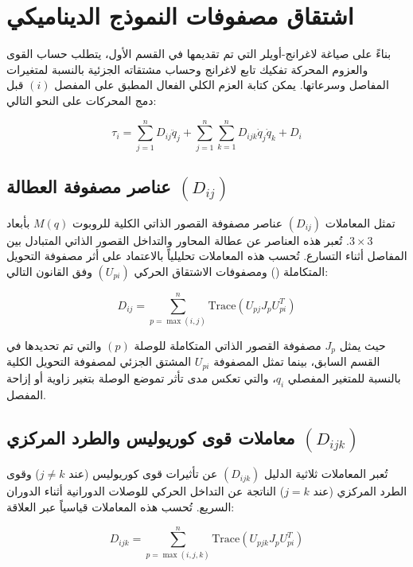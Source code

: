 \section{اشتقاق مصفوفات النموذج الديناميكي }
\label{sec:lagrange_derivation}

بناءً على صياغة لاغرانج-أويلر التي تم تقديمها في القسم الأول، يتطلب حساب القوى والعزوم المحركة تفكيك تابع لاغرانج وحساب مشتقاته الجزئية بالنسبة لمتغيرات المفاصل وسرعاتها.  يمكن كتابة العزم الكلي الفعال المطبق على المفصل $(i)$ قبل دمج المحركات على النحو التالي:

\begin{equation}
\tau_i = \sum_{j=1}^{n} D_{ij}\ddot{q}_j + \sum_{j=1}^{n} \sum_{k=1}^{n} D_{ijk}\dot{q}_j\dot{q}_k + D_i
\label{eq:full_analytical_lagrange}
\end{equation}


\subsection{عناصر مصفوفة العطالة $(D_{ij})$}
تمثل المعاملات $(D_{ij})$ عناصر مصفوفة القصور الذاتي الكلية للروبوت $M(q)$ بأبعاد $3 \times 3$. تُعبر هذه العناصر عن عطالة المحاور والتداخل القصور الذاتي المتبادل بين المفاصل أثناء التسارع. تُحسب هذه المعاملات تحليلياً بالاعتماد على أثر مصفوفة التحويل المتكاملة () ومصفوفات الاشتقاق الحركي $(U_{pi})$ وفق القانون التالي:

\begin{equation}
D_{ij} = \sum_{p=\max(i,j)}^{n} \text{Trace} \left( U_{pj} J_p U_{pi}^T \right)
\label{eq:inertia_element_law}
\end{equation}

حيث يمثل $J_p$ مصفوفة القصور الذاتي المتكاملة للوصلة $(p)$ والتي تم تحديدها في القسم السابق، بينما تمثل المصفوفة $U_{pi}$ المشتق الجزئي لمصفوفة التحويل الكلية بالنسبة للمتغير المفصلي $q_i$، والتي تعكس مدى تأثر تموضع الوصلة بتغير زاوية أو إزاحة المفصل.

\subsection{معاملات قوى كوريوليس والطرد المركزي $(D_{ijk})$}
تُعبر المعاملات ثلاثية الدليل $(D_{ijk})$ عن تأثيرات قوى كوريوليس (عند $j \neq k$) وقوى الطرد المركزي (عند $j = k$) الناتجة عن التداخل الحركي للوصلات الدورانية أثناء الدوران السريع. تُحسب هذه المعاملات قياسياً عبر العلاقة:

\begin{equation}
D_{ijk} = \sum_{p=\max(i,j,k)}^{n} \text{Trace} \left( U_{pjk} J_p U_{pi}^T \right)
\label{eq:coriolis_element_law}
\end{equation}

